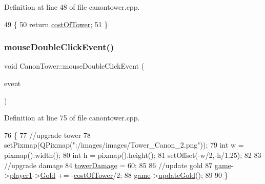 Definition at line 48 of file canontower.\+cpp.


\begin{DoxyCode}
49 \{
50     \textcolor{keywordflow}{return} \hyperlink{class_canon_tower_a545089ae31859c4bf0e46316c637383b}{costOfTower};
51 \}
\end{DoxyCode}
\mbox{\label{class_canon_tower_ac4956cf0bb621db0874403551eaf1eb1}} 
\subsubsection{\texorpdfstring{mouse\+Double\+Click\+Event()}{mouseDoubleClickEvent()}}
{\footnotesize\ttfamily void Canon\+Tower\+::mouse\+Double\+Click\+Event (\begin{DoxyParamCaption}\item[{Q\+Graphics\+Scene\+Mouse\+Event $\ast$}]{event }\end{DoxyParamCaption})}



Definition at line 75 of file canontower.\+cpp.


\begin{DoxyCode}
76 \{
77     \textcolor{comment}{//upgrade tower}
78     setPixmap(QPixmap(\textcolor{stringliteral}{":/images/images/Tower\_Canon\_2.png"}));
79     \textcolor{keywordtype}{int} w = pixmap().width();
80     \textcolor{keywordtype}{int} h = pixmap().height();
81     setOffset(-w/2,-h/1.25);
82 
83     \textcolor{comment}{//upgrade damage}
84     \hyperlink{class_canon_tower_a26ea42f5a200246080dfba01340f057b}{towerDamage} = 60;
85 
86     \textcolor{comment}{//update gold}
87     \hyperlink{canontower_8cpp_a58bdb5643d0814ac4e697a1564b79b70}{game}->\hyperlink{class_game_ad8a7cc146f99c7ec5b7c3c25d73f118c}{player1}->\hyperlink{class_player1_ab390478b345e443398bac442a04b675c}{Gold} += -\hyperlink{class_canon_tower_a545089ae31859c4bf0e46316c637383b}{costOfTower}/2;
88     \hyperlink{canontower_8cpp_a58bdb5643d0814ac4e697a1564b79b70}{game}->\hyperlink{class_game_a065998f7609f63e2987ede928359595a}{updateGold}();
89 
90 \}
\end{DoxyCode}
\mbox{\label{class_canon_tower_a15edd7ff8846e44faaca6ab5e7b183dc}} 
